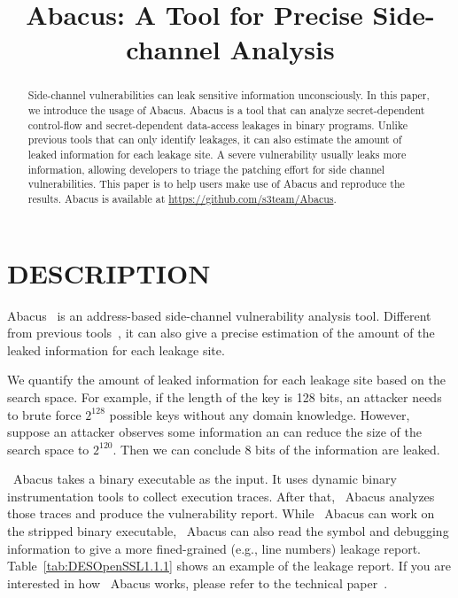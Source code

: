 \documentclass[10pt,conference]{IEEEtran}
\newcommand{\tool}{\textsf{Abacus}}
\begin{document}
\title{\tool{}: A Tool for Precise Side-channel Analysis}
\author{
}


\maketitle

\begin{abstract}
Side-channel vulnerabilities can leak sensitive information unconsciously. 
In this paper, we introduce the usage of Abacus. Abacus is a tool that can analyze secret-dependent control-flow and secret-dependent data-access leakages in binary programs. Unlike previous tools that can only identify leakages, it can also estimate the amount of leaked information for each leakage site. A severe vulnerability usually leaks more information, allowing developers to triage the patching effort for side channel vulnerabilities. This paper is to help users make use of Abacus and reproduce the
results. Abacus is available at \url{https://github.com/s3team/Abacus}.
\end{abstract}

\IEEEpeerreviewmaketitle
{}
\pagestyle{plain}
\section{DESCRIPTION}


Abacus~\cite{bao2021abacus} is an address-based side-channel vulnerability analysis tool. Different from previous tools~\cite{203878,236338,182946}, it can also give a precise estimation of the amount of the leaked information for each leakage site.

We quantify the amount of leaked information for each leakage site based on the search space. For example, if the length of the key is 128 bits, an attacker needs to brute force $2^{128}$ possible keys without any domain knowledge. However, suppose an attacker observes some information an can reduce the size of the search space to $2^{120}$. Then we can conclude 8 bits of the information are leaked.

~\tool{} takes a binary executable as the input. It uses dynamic binary instrumentation tools to collect execution traces. After that, ~\tool{} analyzes those traces and produce the vulnerability report. While ~\tool{} can work on the stripped binary executable, ~\tool{} can also read the symbol and debugging information to give a more fined-grained (e.g., line numbers) leakage report. Table~\ref{tab:DESOpenSSL1.1.1} shows an example of the leakage report. If you are interested in how ~\tool{} works, please refer to the technical paper~\cite{bao2021abacus}.
\end{document}

